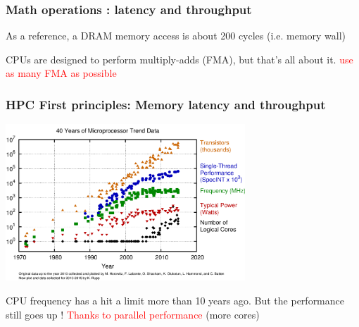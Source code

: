 \begin{frame}[containsverbatim]
\frametitle{Math operations : latency and throughput}

\begin{center}
\begin{table}
\end{table}
\end{center}

As a reference, a DRAM memory access is about 200 cycles (i.e. memory wall)
\vfill

CPUs are designed to perform multiply-adds (FMA), but that's all about it. \textcolor{red}{use as many FMA as possible}
\end{frame}



\begin{frame}[containsverbatim]
\frametitle{HPC First principles: Memory latency and throughput}
\begin{center}
\includegraphics[width=9cm]{DayGilles/images/frequency.png}
\end{center}
CPU frequency has a hit a limit more than 10 years ago. But the performance still goes up ! \textcolor{red}{Thanks to parallel performance} (more cores)
\end{frame}


